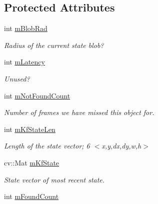 \subsection*{Protected Attributes}
\begin{DoxyCompactItemize}
\item 
int \hyperlink{classTrackingFilter_a7fbddfd9174b54f44599baa5eaa58664}{m\+Blob\+Rad}\hypertarget{classTrackingFilter_a7fbddfd9174b54f44599baa5eaa58664}{}\label{classTrackingFilter_a7fbddfd9174b54f44599baa5eaa58664}

\begin{DoxyCompactList}\small\item\em Radius of the current state blob? \end{DoxyCompactList}\item 
int \hyperlink{classTrackingFilter_a29f1de1c671a767948dd68e79313127b}{m\+Latency}\hypertarget{classTrackingFilter_a29f1de1c671a767948dd68e79313127b}{}\label{classTrackingFilter_a29f1de1c671a767948dd68e79313127b}

\begin{DoxyCompactList}\small\item\em Unused? \end{DoxyCompactList}\item 
int \hyperlink{classTrackingFilter_a224352476f9f4f23622debefe227e81e}{m\+Not\+Found\+Count}
\begin{DoxyCompactList}\small\item\em Number of frames we have missed this object for. \end{DoxyCompactList}\item 
int \hyperlink{classTrackingFilter_ac53ed48f8ead52c1e4732a6c3bd6ea71}{m\+Kf\+State\+Len}\hypertarget{classTrackingFilter_ac53ed48f8ead52c1e4732a6c3bd6ea71}{}\label{classTrackingFilter_ac53ed48f8ead52c1e4732a6c3bd6ea71}

\begin{DoxyCompactList}\small\item\em Length of the state vector; 6 $<$x,y,dx,dy,w,h$>$ \end{DoxyCompactList}\item 
cv\+::\+Mat \hyperlink{classTrackingFilter_a05bbc732f46c36af23f80d0d4eed2b71}{m\+Kf\+State}\hypertarget{classTrackingFilter_a05bbc732f46c36af23f80d0d4eed2b71}{}\label{classTrackingFilter_a05bbc732f46c36af23f80d0d4eed2b71}

\begin{DoxyCompactList}\small\item\em State vector of most recent state. \end{DoxyCompactList}\item 
int \hyperlink{classTrackingFilter_a179f8cb28f6dd803883a54203c058244}{m\+Found\+Count}\hypertarget{classTrackingFilter_a179f8cb28f6dd803883a54203c058244}{}\label{classTrackingFilter_a179f8cb28f6dd803883a54203c058244}


\end{DoxyCompactItemize}
